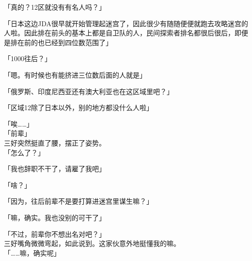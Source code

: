 「真的？12区就没有有名人吗？」

「日本这边JDA很早就开始管理起迷宫了，因此很少有随随便便就跑去攻略迷宫的人啦。因此排在前头的基本上都是自卫队的人，民间探索者排名都很后很后，即便是排在前的也已经到四位数范围了」

「1000往后？」

「嗯。有时候也有能挤进三位数后面的人就是」

「俄罗斯、印度尼西亚还有澳大利亚也在这区域里吧？」

「区域12除了日本以外，别的地方都没什么人啦」

「唉……」\\

「前辈」\\

三好突然挺直了腰，摆正了姿势。\\

「怎么了？」

「我也辞职不干了，请雇了我吧」

「啥？」

「因为，往后前辈不是要打算进迷宫里谋生嘛？」

「嘛，确实。我也没别的可干了」

「不过，前辈你不想出名对吧？」\\

三好嘴角微微弯起，如此说到。这家伙意外地挺懂我的嘛。\\

「……嘛，确实呢」

